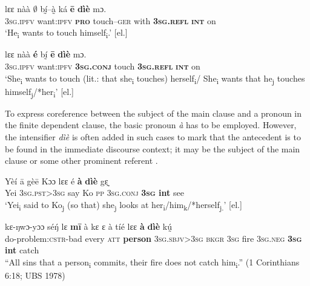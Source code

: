 \documentclass[output=paper]{langscibook}
\begin{document}
\ea
    \label{ex:Kachaturyan:18} 
    \ea
    \label{ex:Kachaturyan:18a} 
\gll lɛɛ  nàà  \textbf{${\emptyset}$} bḭ́–à̰  ká  \textbf{ē}  \textbf{dìè}  mɔ.\\
     3\textsc{sg}.\textsc{ipfv}  want:\textsc{ipfv}  \textbf{\textsc{pro}}  touch–\textsc{ger}  with  \textbf{3\textsc{sg}}\textbf{.\textsc{refl}}  \textbf{\textsc{int}}  on\\
\glt ‘He\textsubscript{i} wants to touch himself\textsubscript{i}.’ [el.]
    
    \ex
    \label{ex:Kachaturyan:18b}
    \gll lɛɛ  nàà  \textbf{é}  bḭ́  \textbf{ē}  \textbf{dìè}  mɔ.  \\
     3\textsc{sg}.\textsc{ipfv}  want:\textsc{ipfv}  \textbf{3\textsc{sg}}\textbf{.\textsc{conj}}  touch  \textbf{3\textsc{sg}}\textbf{.\textsc{refl}}  \textbf{\textsc{int}}  on\\
\glt ‘She\textsubscript{i} wants to touch (lit.: that she\textsubscript{i} touches) herself\textsubscript{i}/ She\textsubscript{i} wants that he\textsubscript{j} touches himself\textsubscript{j}/*her\textsubscript{i}’ [el.]
\z
\z


To express coreference between the subject of the main clause and a pronoun in the finite dependent clause, the basic pronoun \textit{à} has to be employed. However, the intensifier \textit{dìè} is often added in such cases to mark that the antecedent is to be found in the immediate discourse context; it may be the subject of the main clause  or some other prominent referent .

\ea
    \label{ex:Kachaturyan:19} 
 \gll Yèí  ā  gèē  Kɔɔ  lɛɛ  é  \textbf{à}  \textbf{dìè}  gɛ̰\\
     Yei  3\textsc{sg.pst>3sg}  say  Ko  \textsc{pp}  \textsc{3sg.conj}  \textbf{\textsc{3sg}  \textbf{int}}  see\\
\glt ‘Yei\textsubscript{i} said to Ko\textsubscript{j} (so that) she\textsubscript{j} looks at her\textsubscript{i}/him\textsubscript{k}/*herself\textsubscript{j.}’ [el.]
\z


\ea
    \label{ex:Kachaturyan:20} 
 \gll kɛ-ŋwɔ-yɔɔ  sé\'{ŋ}  lɛ  \textbf{mī}  à  kɛ  ɛ  à  tíé  lɛɛ  \textbf{à}  \textbf{dìè}  kṵ́\\
     do-problem:\textsc{cstr-}bad  every  \textsc{att}  \textbf{person}  3\textsc{sg.sbjv>3sg}  \textsc{bkgr}  \textsc{3sg}  fire  \textsc{3sg.neg}  \textbf{\textsc{3sg}  \textbf{int}}  catch\\
\glt “All sins that a person\textsubscript{i} commits, their fire does not catch him\textsubscript{i}.” (1 Corinthians 6:18; UBS 1978)\z
\end{document}
